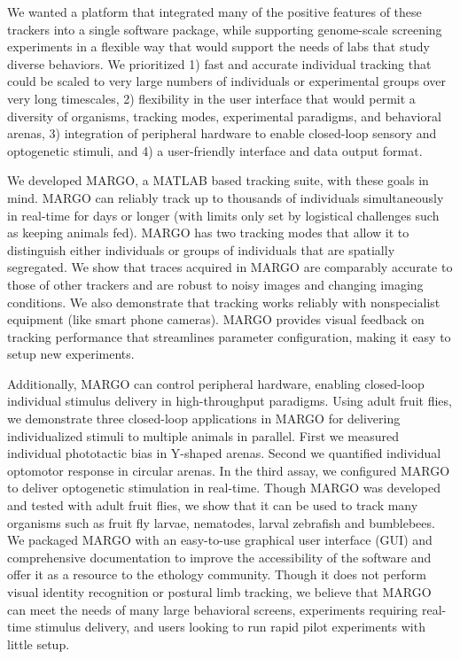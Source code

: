 \documentclass[10pt]{article}
\begin{document}
\begin{multicols}{2}
We wanted a platform that integrated many of the positive features of these trackers into a single software package, while supporting genome-scale screening experiments in a flexible way that would support the needs of labs that study diverse behaviors. We prioritized 1) fast and accurate individual tracking that could be scaled to very large numbers of individuals or experimental groups over very long timescales, 2) flexibility in the user interface that would permit a diversity of organisms, tracking modes, experimental paradigms, and behavioral arenas, 3) integration of peripheral hardware to enable closed-loop sensory and optogenetic stimuli, and 4) a user-friendly interface and data output format. 

We developed MARGO, a MATLAB based tracking suite, with these goals in mind. MARGO can reliably track up to thousands of individuals simultaneously in real-time for days or longer (with limits only set by logistical challenges such as keeping animals fed). MARGO has two tracking modes that allow it to distinguish either individuals or groups of individuals that are spatially segregated. We show that traces acquired in MARGO are comparably accurate to those of other trackers and are robust to noisy images and changing imaging conditions. We also demonstrate that tracking works reliably with nonspecialist equipment (like smart phone cameras). MARGO provides visual feedback on tracking performance that streamlines parameter configuration, making it easy to setup new experiments. 

Additionally, MARGO can control peripheral hardware, enabling closed-loop individual stimulus delivery in high-throughput paradigms. Using adult fruit flies, we demonstrate three closed-loop \citep{heisenberg_wolf_1984} applications in MARGO for delivering individualized stimuli to multiple animals in parallel. First we measured individual phototactic bias in Y-shaped arenas. Second we quantified individual optomotor response in circular arenas. In the third assay, we configured MARGO to deliver optogenetic stimulation in real-time. Though MARGO was developed and tested with adult fruit flies, we show that it can be used to track many organisms such as fruit fly larvae, nematodes, larval zebrafish and bumblebees. We packaged MARGO with an easy-to-use graphical user interface (GUI) and comprehensive documentation to improve the accessibility of the software and offer it as a resource to the ethology community. Though it does not perform visual identity recognition or postural limb tracking, we believe that MARGO can meet the needs of many large behavioral screens, experiments requiring real-time stimulus delivery, and users looking to run rapid pilot experiments with little setup.


\end{multicols}
\end{document}
